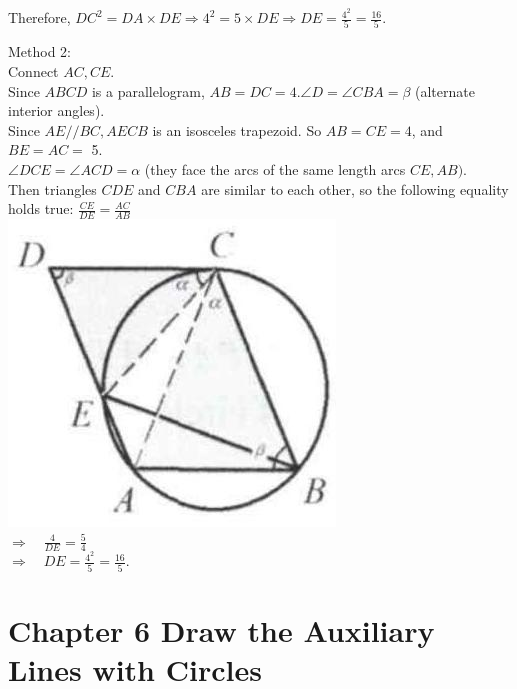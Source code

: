 \documentclass[10pt]{article}
\begin{document}
Therefore, \(D C^{2}=D A \times D E \Rightarrow 4^{2}=5 \times D E \Rightarrow D E=\frac{4^{2}}{5}=\frac{16}{5}\).

Method 2:\\
Connect \(A C, C E\).\\
Since \(A B C D\) is a parallelogram, \(A B=D C=4 . \angle D=\angle C B A=\beta\) (alternate interior angles).\\
Since \(A E / / B C, A E C B\) is an isosceles trapezoid. So \(A B=C E=4\), and \(B E=A C=\) 5.\\
\(\angle D C E=\angle A C D=\alpha\) (they face the arcs of the same length arcs \(C E, A B)\).\\
Then triangles \(C D E\) and \(C B A\) are similar to each other, so the following equality holds true: \(\frac{C E}{D E}=\frac{A C}{A B}\)\\
\includegraphics[max width=\textwidth, center]{2025_04_17_97bc1f7e44d93c271a88g-168}\\
\(\Rightarrow \quad \frac{4}{D E}=\frac{5}{4}\)\\
\(\Rightarrow \quad D E=\frac{4^{2}}{5}=\frac{16}{5}\).

\section*{Chapter 6 Draw the Auxiliary Lines with Circles}
\end{document}

